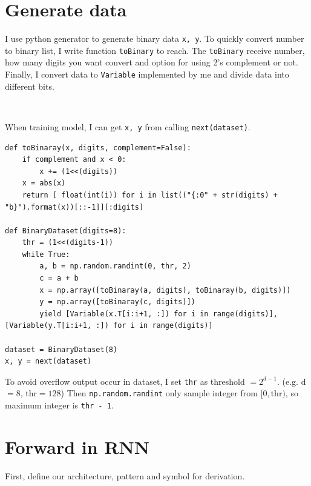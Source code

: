 \documentclass[12pt]{article}
\begin{document}
\section{Generate data}

I use python generator to generate binary data \verb|x, y|. To quickly convert number to binary list, I write function \verb|toBinary| to reach. The \verb|toBinary| receive number, how many digits you want convert and option for using 2's complement or not. Finally, I convert data to \verb|Variable| implemented by me and divide data into different bits. 
\par \  \par
When training model, I can get \verb|x, y| from calling \verb|next(dataset)|.

\begin{verbatim}
def toBinaray(x, digits, complement=False):
    if complement and x < 0:
        x += (1<<(digits))
    x = abs(x)
    return [ float(int(i)) for i in list(("{:0" + str(digits) + "b}").format(x))[::-1]][:digits]

def BinaryDataset(digits=8):
    thr = (1<<(digits-1))
    while True:
        a, b = np.random.randint(0, thr, 2)
        c = a + b
        x = np.array([toBinaray(a, digits), toBinaray(b, digits)])
        y = np.array([toBinaray(c, digits)])
        yield [Variable(x.T[i:i+1, :]) for i in range(digits)], [Variable(y.T[i:i+1, :]) for i in range(digits)]

dataset = BinaryDataset(8)
x, y = next(dataset)
\end{verbatim}

To avoid overflow output occur in dataset, I set \verb|thr| as threshold $= 2^{d-1}$. (e.g. d$=8$, thr$=128$) Then \verb|np.random.randint| only sample integer from $[ 0, \text{thr} )$, so maximum integer is \verb|thr - 1|.

\section{Forward in RNN}

First, define our architecture, pattern and symbol for derivation.
\end{document}
